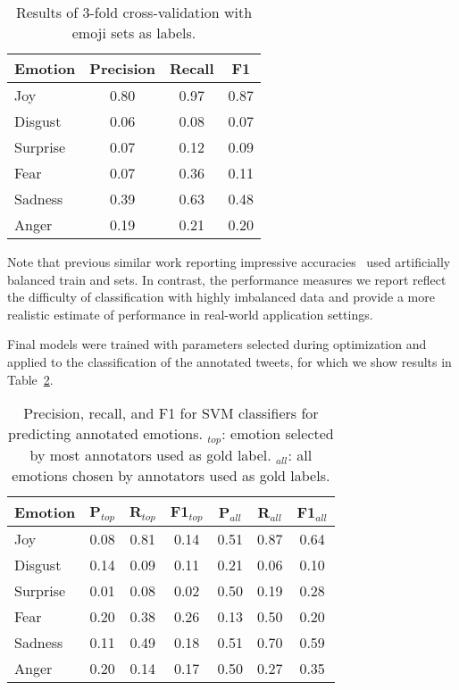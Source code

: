 \documentclass[10pt, a4paper]{article}
\begin{document}
\begin{table}[!ht]
\centering
\begin{tabular}{l | c | c | c}
\textbf{Emotion} & \textbf{Precision} & \textbf{Recall} &   \textbf{F1} \\
\hline
             Joy & 0.80       & 0.97   & 0.87 \\
         Disgust & 0.06       & 0.08   & 0.07 \\
        Surprise & 0.07       & 0.12   & 0.09 \\
            Fear & 0.07       & 0.36   & 0.11 \\
         Sadness & 0.39       & 0.63   & 0.48 \\
           Anger & 0.19       & 0.21   & 0.20 \\
\end{tabular}
\caption{Results of 3-fold cross-validation with emoji sets as labels.}
\label{tab:SVM-CV-results}
\end{table}

Note that previous similar work reporting impressive accuracies~\cite{Purver2012Experimenting} used artificially balanced train and sets. In contrast, the performance measures we report reflect the difficulty of classification with highly imbalanced data and provide a more realistic estimate of performance in real-world application settings.

Final models were trained with parameters selected during optimization and applied to the classification of the annotated tweets, for which we show results in Table~\ref{tab:svm-annot-predict}.

\begin{table}[!ht]
\centering
\begin{tabular}{l | c | c | c | c | c | c}
\textbf{Emotion} & \textbf{P$_{top}$}  & \textbf{R$_{top}$} & \textbf{F1$_{top}$} & \textbf{P$_{all}$}  & \textbf{R$_{all}$} & \textbf{F1$_{all}$} \\
\hline
         Joy &   0.08  & 0.81  & 0.14  &  0.51  & 0.87  & 0.64 \\
     Disgust &   0.14  & 0.09  & 0.11  &  0.21  & 0.06  & 0.10 \\
    Surprise &   0.01  & 0.08  & 0.02  &  0.50  & 0.19  & 0.28 \\
        Fear &   0.20  & 0.38  & 0.26  &  0.13  & 0.50  & 0.20 \\
     Sadness &   0.11  & 0.49  & 0.18  &  0.51  & 0.70  & 0.59 \\
       Anger &   0.20  & 0.14  & 0.17  &  0.50  & 0.27  & 0.35 \\

\end{tabular}
\caption{Precision, recall, and F1 for SVM classifiers for predicting annotated emotions. $_{top}$: emotion selected by most annotators used as gold label. $_{all}$: all emotions chosen by annotators used as gold labels.}
\label{tab:svm-annot-predict}
\end{table}
\end{document}
